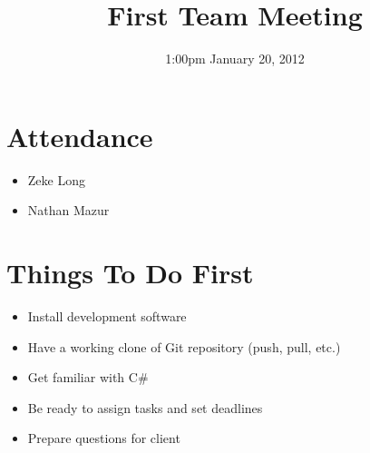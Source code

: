 \documentclass{article}
\begin{document}
\title{First Team Meeting}
\date{1:00pm January 20, 2012}
\maketitle

\section{Attendance}
\begin{itemize}
\item Zeke Long
\item Nathan Mazur
\end{itemize}

\section{Things To Do First}
\begin{itemize}
\item Install development software
\item Have a working clone of Git repository (push, pull, etc.)
\item Get familiar with C#
\item Be ready to assign tasks and set deadlines
\item Prepare questions for client
\end{itemize}
\end{document}
